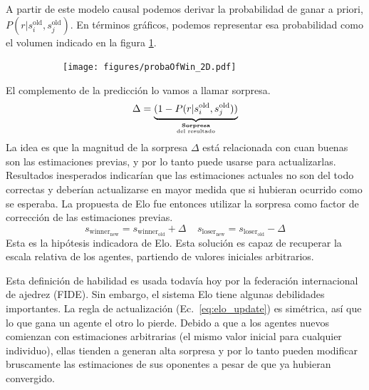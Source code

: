 \documentclass[a4paper,11pt]{book}
\newcommand\hfrac[2]{\genfrac{}{}{0pt}{}{#1}{#2}} %
\theoremstyle{definition}
\begin{document}
A partir de este modelo causal podemos derivar la probabilidad de ganar a priori, $P(r|s_i^{\text{old}},s_j^{\text{old}})$.
%
En términos gráficos, podemos representar esa probabilidad como el volumen indicado en la figura \ref{fig:probaOfWin_2D}.
%
\begin{figure}[ht!]
\centering \small
\begin{subfigure}[c]{0.49\textwidth}
       \texttt{[image: figures/probaOfWin\_2D.pdf]}
     \label{fig:probaOfWin_2D}
    \end{subfigure}
\caption{}
\label{fig:elo}
\end{figure}
%
El complemento de la predicci\'on lo vamos a llamar sorpresa.
%
\begin{equation*}
 \Delta = \underbrace{(1 - P(r|s_i^{\text{old}},s_j^{\text{old}}))}_{\hfrac{\textbf{Sorpresa}}{\text{del resultado}}}
\end{equation*}
%
La idea es que la magnitud de la sorpresa $\Delta$ est\'a relacionada con cuan buenas son las estimaciones previas, y por lo tanto puede usarse para actualizarlas.
%
Resultados inesperados indicar\'ian que las estimaciones actuales no son del todo correctas y deber\'ian actualizarse en mayor medida que si hubieran ocurrido como se esperaba.
%
La propuesta de Elo fue entonces utilizar la sorpresa como factor de correcci\'on de las estimaciones previas.
%
\begin{equation}\label{eq:elo_update}
 s_{\text{winner}_\text{new}} = s_{\text{winner}_\text{old}} + \Delta \ \ \ \ \ s_{\text{loser}_\text{new}} = s_{\text{loser}_\text{old}} - \Delta
\end{equation}
%
Esta es la hip\'otesis indicadora de Elo.
%
Esta soluci\'on es capaz de recuperar la escala relativa de los agentes, partiendo de valores iniciales arbitrarios.
%
\begin{center}
\end{center}
%
Esta definici\'on de habilidad es usada todav\'ia hoy por la federaci\'on internacional de ajedrez (FIDE).
%
Sin embargo, el sistema Elo tiene algunas debilidades importantes.
%
La regla de actualizaci\'on (Ec.~\eqref{eq:elo_update}) es sim\'etrica, as\'i que lo que gana un agente el otro lo pierde.
%
Debido a que a los agentes nuevos comienzan con estimaciones arbitrarias (el mismo valor inicial para cualquier individuo), ellas tienden a generan alta sorpresa y por lo tanto pueden modificar bruscamente las estimaciones de sus oponentes a pesar de que ya hubieran convergido.
\end{document}
